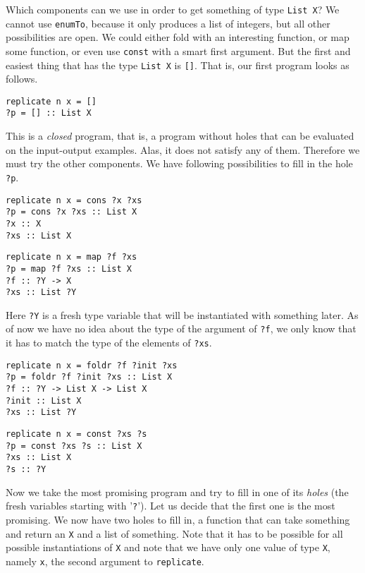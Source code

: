 Which components can we use in order to get something of type \lstinline?List X?? We cannot use \lstinline?enumTo?, because it only produces a list of integers, but all other possibilities are open. We could either fold  with an interesting function, or map some function, or even use \lstinline?const? with a smart first argument. But the first and easiest thing that has the type \lstinline?List X? is \lstinline?[]?. That is, our first program looks as follows.
\begin{lstlisting}[style=plain]
replicate n x = []
?p = [] :: List X
\end{lstlisting}
This is a \emph{closed} program, that is, a program without holes that can be evaluated on the input-output examples. Alas, it does not satisfy any of them. Therefore we must try the other components. We have following possibilities to fill in the hole \lstinline!?p!.

\begin{lstlisting}[style=plain]
replicate n x = cons ?x ?xs
?p = cons ?x ?xs :: List X
?x :: X
?xs :: List X
\end{lstlisting}

\begin{lstlisting}[style=plain]
replicate n x = map ?f ?xs
?p = map ?f ?xs :: List X
?f :: ?Y -> X
?xs :: List ?Y
\end{lstlisting}
Here \lstinline!?Y! is a fresh type variable that will be instantiated with something later. As of now we have no idea about the type of the argument of \lstinline!?f!, we only know that it has to match the type of the elements of \lstinline!?xs!.

\begin{lstlisting}[style=plain]
replicate n x = foldr ?f ?init ?xs
?p = foldr ?f ?init ?xs :: List X
?f :: ?Y -> List X -> List X
?init :: List X
?xs :: List ?Y
\end{lstlisting}

\begin{lstlisting}[style=plain]
replicate n x = const ?xs ?s
?p = const ?xs ?s :: List X
?xs :: List X
?s :: ?Y
\end{lstlisting}

Now we take the most promising program and try to fill in one of its \emph{holes} (the fresh variables starting with '\lstinline!?!').
Let us decide that the first one is the most promising. We now have two holes to fill in, a function that can take something and return an \lstinline?X? and a list of something. Note that it has to be possible for all possible instantiations of \lstinline?X? and note that we have only one value of type \lstinline?X?, namely \lstinline?x?, the second argument to \lstinline?replicate?.


